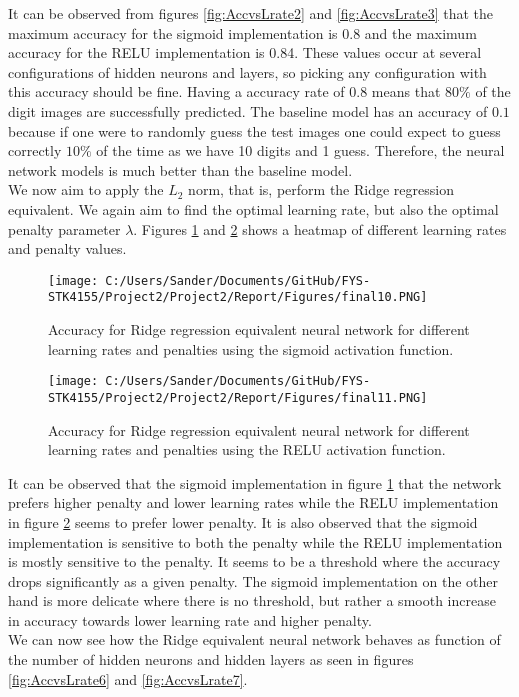 \documentclass[12pt,a4paper]{article}
\begin{document}
\noindent It can be observed from figures \ref{fig:AccvsLrate2} and \ref{fig:AccvsLrate3} that the maximum accuracy for the sigmoid implementation is 0.8 and the maximum accuracy for the RELU implementation is 0.84. These values occur at several configurations of hidden neurons and layers, so picking any configuration with this accuracy should be fine. Having a accuracy rate of 0.8 means that $80\%$ of the digit images are successfully predicted. The baseline model has an accuracy of $0.1$ because if one were to randomly guess the test images one could expect to guess correctly $10\%$ of the time as we have 10 digits and 1 guess. Therefore, the neural network models is much better than the baseline model.
\\
We now aim to apply the $L_2$ norm, that is, perform the Ridge regression equivalent. We again aim to find the optimal learning rate, but also the optimal penalty parameter $\lambda$. Figures \ref{fig:AccvsLrate4} and \ref{fig:AccvsLrate5} shows a heatmap of different learning rates and penalty values.

\begin{figure}[H]
\centering
\texttt{[image: C:/Users/Sander/Documents/GitHub/FYS-STK4155/Project2/Project2/Report/Figures/final10.PNG]}
\caption{\label{fig:AccvsLrate4} Accuracy for Ridge regression equivalent neural network for different learning rates and penalties using the sigmoid activation function.}
\end{figure}

\begin{figure}[H]
\centering
\texttt{[image: C:/Users/Sander/Documents/GitHub/FYS-STK4155/Project2/Project2/Report/Figures/final11.PNG]}
\caption{\label{fig:AccvsLrate5} Accuracy for Ridge regression equivalent neural network for different learning rates and penalties using the RELU activation function.}
\end{figure}

\noindent It can be observed that the sigmoid implementation in figure \ref{fig:AccvsLrate4} that the network prefers higher penalty and lower learning rates while the RELU implementation in figure \ref{fig:AccvsLrate5} seems to prefer lower penalty. It is also observed that the sigmoid implementation is sensitive to both the penalty while the RELU implementation is mostly sensitive to the penalty. It seems to be a threshold where the accuracy drops significantly as a given penalty. The sigmoid implementation on the other hand is more delicate where there is no threshold, but rather a smooth increase in accuracy towards lower learning rate and higher penalty.
\\
We can now see how the Ridge equivalent neural network behaves as function of the number of hidden neurons and hidden layers as seen in figures \ref{fig:AccvsLrate6} and \ref{fig:AccvsLrate7}.
\end{document}
